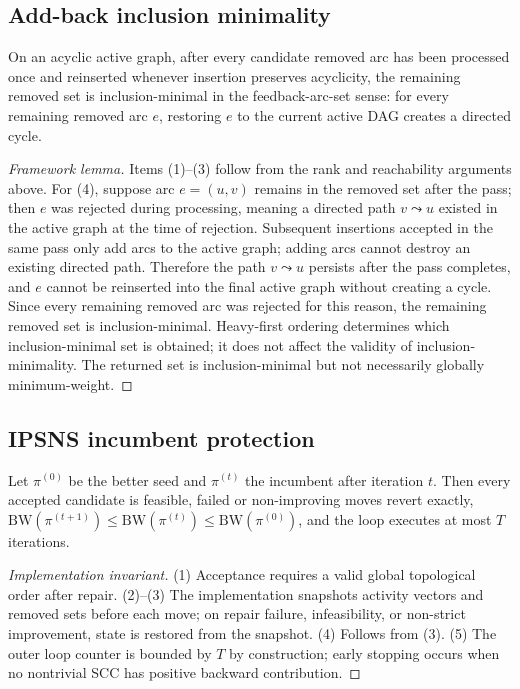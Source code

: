 \subsection{Add-back inclusion minimality}

\begin{proposition}
On an acyclic active graph, after every candidate removed arc has been processed once and reinserted whenever insertion preserves acyclicity, the remaining removed set is inclusion-minimal in the feedback-arc-set sense: for every remaining removed arc \(e\), restoring \(e\) to the current active DAG creates a directed cycle.
\end{proposition}

\begin{proof}[Framework lemma]
Items (1)--(3) follow from the rank and reachability arguments above. For (4), suppose arc $e=(u,v)$ remains in the removed set after the pass; then $e$ was rejected during processing, meaning a directed path $v\leadsto u$ existed in the active graph at the time of rejection. Subsequent insertions accepted in the same pass only add arcs to the active graph; adding arcs cannot destroy an existing directed path. Therefore the path $v\leadsto u$ persists after the pass completes, and $e$ cannot be reinserted into the final active graph without creating a cycle. Since every remaining removed arc was rejected for this reason, the remaining removed set is inclusion-minimal. Heavy-first ordering determines which inclusion-minimal set is obtained; it does not affect the validity of inclusion-minimality. The returned set is inclusion-minimal but not necessarily globally minimum-weight.
\end{proof}

\subsection{IPSNS incumbent protection}

\begin{proposition}
Let $\pi^{(0)}$ be the better seed and $\pi^{(t)}$ the incumbent after iteration $t$. Then every accepted candidate is feasible, failed or non-improving moves revert exactly, $\mathrm{BW}(\pi^{(t+1)})\le \mathrm{BW}(\pi^{(t)})\le \mathrm{BW}(\pi^{(0)})$, and the loop executes at most $T$ iterations.
\end{proposition}

\begin{proof}[Implementation invariant]
(1) Acceptance requires a valid global topological order after repair. (2)--(3) The implementation snapshots activity vectors and removed sets before each move; on repair failure, infeasibility, or non-strict improvement, state is restored from the snapshot. (4) Follows from (3). (5) The outer loop counter is bounded by $T$ by construction; early stopping occurs when no nontrivial SCC has positive backward contribution.
\end{proof}

